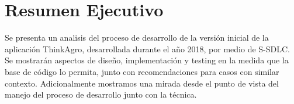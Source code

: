 \section{Resumen Ejecutivo}
Se presenta un analisis del proceso de desarrollo de la versión inicial de la aplicación ThinkAgro, desarrollada durante el año 2018, por medio de S-SDLC. Se mostrarán aspectos de diseño, implementación y testing en la medida que la base de código lo permita, junto con recomendaciones para casos con similar contexto. Adicionalmente mostramos una mirada desde el punto de vista del manejo del proceso de desarrollo junto con la técnica.